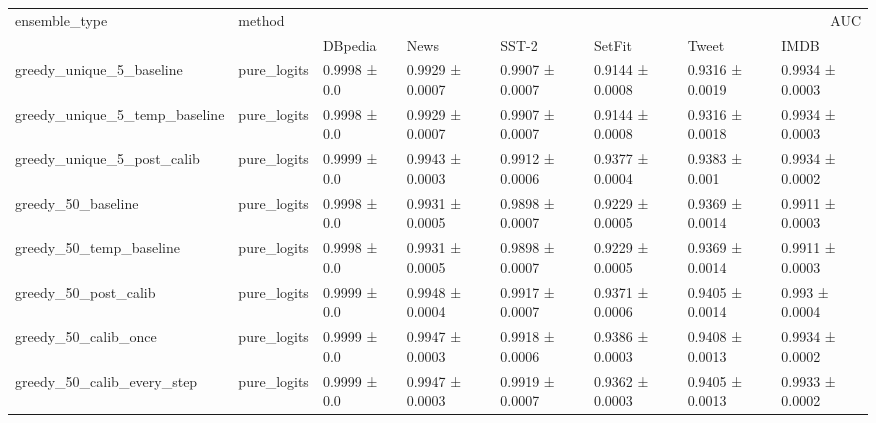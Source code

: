 \begin{tabular}{llllllll}
\toprule
ensemble_type & method & \multicolumn{6}{r}{AUC} \\
 &  & DBpedia & News & SST-2 & SetFit & Tweet & IMDB \\
\midrule
greedy_unique_5_baseline & pure_logits & 0.9998 ± 0.0 & 0.9929 ± 0.0007 & 0.9907 ± 0.0007 & 0.9144 ± 0.0008 & 0.9316 ± 0.0019 & 0.9934 ± 0.0003 \\
greedy_unique_5_temp_baseline & pure_logits & 0.9998 ± 0.0 & 0.9929 ± 0.0007 & 0.9907 ± 0.0007 & 0.9144 ± 0.0008 & 0.9316 ± 0.0018 & 0.9934 ± 0.0003 \\
greedy_unique_5_post_calib & pure_logits & 0.9999 ± 0.0 & 0.9943 ± 0.0003 & 0.9912 ± 0.0006 & 0.9377 ± 0.0004 & 0.9383 ± 0.001 & 0.9934 ± 0.0002 \\
greedy_50_baseline & pure_logits & 0.9998 ± 0.0 & 0.9931 ± 0.0005 & 0.9898 ± 0.0007 & 0.9229 ± 0.0005 & 0.9369 ± 0.0014 & 0.9911 ± 0.0003 \\
greedy_50_temp_baseline & pure_logits & 0.9998 ± 0.0 & 0.9931 ± 0.0005 & 0.9898 ± 0.0007 & 0.9229 ± 0.0005 & 0.9369 ± 0.0014 & 0.9911 ± 0.0003 \\
greedy_50_post_calib & pure_logits & 0.9999 ± 0.0 & 0.9948 ± 0.0004 & 0.9917 ± 0.0007 & 0.9371 ± 0.0006 & 0.9405 ± 0.0014 & 0.993 ± 0.0004 \\
greedy_50_calib_once & pure_logits & 0.9999 ± 0.0 & 0.9947 ± 0.0003 & 0.9918 ± 0.0006 & 0.9386 ± 0.0003 & 0.9408 ± 0.0013 & 0.9934 ± 0.0002 \\
greedy_50_calib_every_step & pure_logits & 0.9999 ± 0.0 & 0.9947 ± 0.0003 & 0.9919 ± 0.0007 & 0.9362 ± 0.0003 & 0.9405 ± 0.0013 & 0.9933 ± 0.0002 \\
\bottomrule
\end{tabular}
